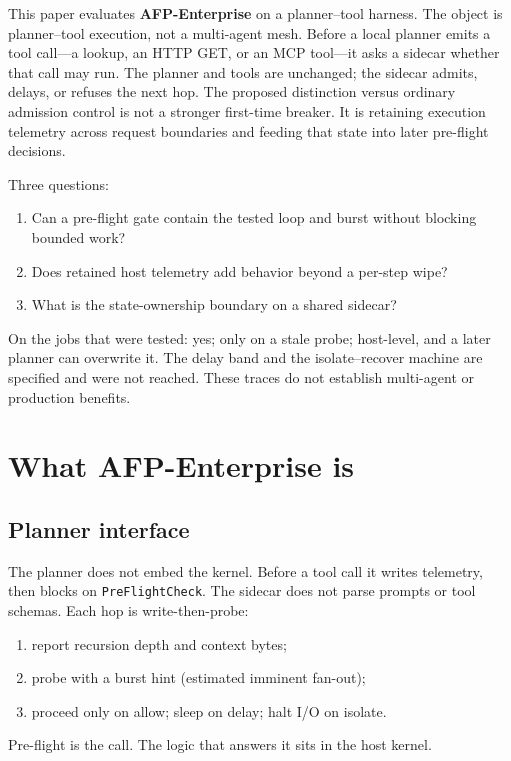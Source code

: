 \documentclass[11pt,a4paper]{article}
\begin{document}
This paper evaluates \textbf{AFP-Enterprise} on a planner--tool harness.
The object is planner--tool execution, not a multi-agent mesh.
Before a local planner emits a tool call---a lookup, an HTTP GET, or an MCP tool---it asks a sidecar whether that call may run.
The planner and tools are unchanged; the sidecar admits, delays, or refuses the next hop.
The proposed distinction versus ordinary admission control is not a stronger first-time breaker.
It is retaining execution telemetry across request boundaries and feeding that state into later pre-flight decisions.

Three questions:
\begin{enumerate}
  \item Can a pre-flight gate contain the tested loop and burst without blocking bounded work?
  \item Does retained host telemetry add behavior beyond a per-step wipe?
  \item What is the state-ownership boundary on a shared sidecar?
\end{enumerate}
On the jobs that were tested: yes; only on a stale probe; host-level, and a later planner can overwrite it.
The delay band and the isolate--recover machine are specified and were not reached.
These traces do not establish multi-agent or production benefits.

\section{What AFP-Enterprise is}
\label{sec:target}

\subsection{Planner interface}
\label{sec:sut}

The planner does not embed the kernel.
Before a tool call it writes telemetry, then blocks on \texttt{PreFlightCheck}.
The sidecar does not parse prompts or tool schemas.
Each hop is write-then-probe:
\begin{enumerate}
  \item report recursion depth and context bytes;
  \item probe with a burst hint (estimated imminent fan-out);
  \item proceed only on allow; sleep on delay; halt I/O on isolate.
\end{enumerate}
Pre-flight is the call. The logic that answers it sits in the host kernel.
\end{document}

